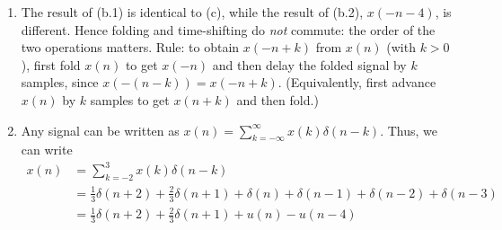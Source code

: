 \documentclass[12pt,a4paper]{article}
\begin{document}
\begin{enumerate}[label=\textbf{(\alph*)}, leftmargin=*]
\begin{figure}[H]
        \caption{The signal $x(-n+4)$}
    \end{figure}
    \item 
    The result of (b.1) is identical to (c), while the result of (b.2), $x(-n-4)$, is different. Hence folding and time-shifting do \emph{not} commute: the order of the two operations matters.
    Rule: to obtain $x(-n+k)$ from $x(n)$ (with $k>0$), first fold $x(n)$ to get $x(-n)$ and then
    delay the folded signal by $k$ samples, since $x(-(n-k)) = x(-n+k)$.
    (Equivalently, first advance $x(n)$ by $k$ samples to get $x(n+k)$ and then fold.)
    \item 
    Any signal can be written as $x(n) = \sum_{k=-\infty}^{\infty}x(k)\delta(n-k)$.
    Thus, we can write
    \begin{align*}
        x(n)&=\sum_{k=-2}^{3}x(k)\delta(n-k)\\
        &=\frac{1}{3}\delta(n+2)+\frac{2}{3}\delta(n+1)
        +\delta(n)+\delta(n-1)+\delta(n-2)+\delta(n-3)\\
        &=\frac{1}{3}\delta(n+2)+\frac{2}{3}\delta(n+1)+u(n)-u(n-4)
    \end{align*}
\end{enumerate}
\end{document}
